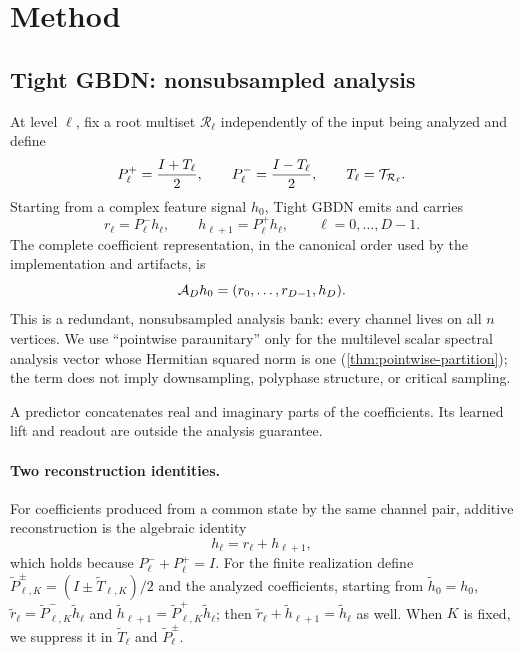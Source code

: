 \section{Method}
\label{sec:method}

\subsection{Tight GBDN: nonsubsampled analysis}
\label{sec:method-tight}

At level $\ell$, fix a root multiset $\mathcal R_\ell$ independently of the
input being analyzed and define
\begin{equation}
  P_\ell^{+}=\frac{I+T_\ell}{2},
  \qquad
  P_\ell^{-}=\frac{I-T_\ell}{2},
  \qquad T_\ell=\mathcal T_{\mathcal R_\ell}.
  \label{eq:tight-channels}
\end{equation}
Starting from a complex feature signal $h_0$, Tight GBDN emits and carries
\begin{equation}
  r_\ell=P_\ell^-h_\ell,
  \qquad
  h_{\ell+1}=P_\ell^+h_\ell,
  \qquad \ell=0,\ldots,D-1.
  \label{eq:analysis-recursion}
\end{equation}
The complete coefficient representation, in the canonical order used by the
implementation and artifacts, is
\begin{equation}
  \mathcal A_Dh_0=(r_0,\ldots,r_{D-1},h_D).
  \label{eq:analysis-map}
\end{equation}
This is a redundant, nonsubsampled analysis bank: every channel lives on all
$n$ vertices.  We use ``pointwise paraunitary'' only for the multilevel
scalar spectral analysis vector whose Hermitian squared norm is one
(\cref{thm:pointwise-partition}); the term does not imply downsampling,
polyphase structure, or critical sampling.

A predictor concatenates real and imaginary parts of the coefficients.  Its
learned lift and readout are outside the analysis guarantee.

\paragraph{Two reconstruction identities.}
For coefficients produced from a common state by the same channel pair,
additive reconstruction is the algebraic identity
\begin{equation}
  h_\ell=r_\ell+h_{\ell+1},
  \label{eq:additive-reconstruction}
\end{equation}
which holds because $P_\ell^-+P_\ell^+=I$.  For the finite realization define
$\widetilde P_{\ell,K}^{\pm}=(I\pm\widetilde T_{\ell,K})/2$ and the analyzed
coefficients, starting from $\widetilde h_0=h_0$,
$\widetilde r_\ell=\widetilde P_{\ell,K}^-\widetilde h_\ell$ and
$\widetilde h_{\ell+1}=\widetilde P_{\ell,K}^+\widetilde h_\ell$; then
$\widetilde r_\ell+\widetilde h_{\ell+1}=\widetilde h_\ell$ as well.
When $K$ is fixed, we suppress it in $\widetilde T_\ell$ and
$\widetilde P_\ell^\pm$.

